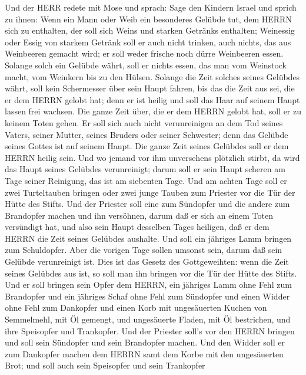  Und der HERR redete mit Mose und sprach:  Sage
den Kindern Israel und sprich zu ihnen: Wenn ein Mann oder Weib ein
besonderes Gelübde tut, dem HERRN sich zu enthalten,  der
soll sich Weins und starken Getränks enthalten; Weinessig oder Essig von
starkem Getränk soll er auch nicht trinken, auch nichts, das aus
Weinbeeren gemacht wird; er soll weder frische noch dürre Weinbeeren
essen.  Solange solch ein Gelübde währt, soll er nichts
essen, das man vom Weinstock macht, vom Weinkern bis zu den Hülsen.
 Solange die Zeit solches seines Gelübdes währt, soll kein
Schermesser über sein Haupt fahren, bis das die Zeit aus sei, die er dem
HERRN gelobt hat; denn er ist heilig und soll das Haar auf seinem Haupt
lassen frei wachsen.  Die ganze Zeit über, die er dem HERRN
gelobt hat, soll er zu keinem Toten gehen.  Er soll sich
auch nicht verunreinigen an dem Tod seines Vaters, seiner Mutter, seines
Bruders oder seiner Schwester; denn das Gelübde seines Gottes ist auf
seinem Haupt.  Die ganze Zeit seines Gelübdes soll er dem
HERRN heilig sein.  Und wo jemand vor ihm unversehens
plötzlich stirbt, da wird das Haupt seines Gelübdes verunreinigt; darum
soll er sein Haupt scheren am Tage seiner Reinigung, das ist am
siebenten Tage.  Und am achten Tage soll er zwei
Turteltauben bringen oder zwei junge Tauben zum Priester vor die Tür der
Hütte des Stifts.  Und der Priester soll eine zum Sündopfer
und die andere zum Brandopfer machen und ihn versöhnen, darum daß er
sich an einem Toten versündigt hat, und also sein Haupt desselben Tages
heiligen,  daß er dem HERRN die Zeit seines Gelübdes
aushalte. Und soll ein jähriges Lamm bringen zum Schuldopfer. Aber die
vorigen Tage sollen umsonst sein, darum daß sein Gelübde verunreinigt
ist.  Dies ist das Gesetz des Gottgeweihten: wenn die Zeit
seines Gelübdes aus ist, so soll man ihn bringen vor die Tür der Hütte
des Stifts.  Und er soll bringen sein Opfer dem HERRN, ein
jähriges Lamm ohne Fehl zum Brandopfer und ein jähriges Schaf ohne Fehl
zum Sündopfer und einen Widder ohne Fehl zum Dankopfer  und
einen Korb mit ungesäuerten Kuchen von Semmelmehl, mit Öl gemengt, und
ungesäuerte Fladen, mit Öl bestrichen, und ihre Speisopfer und
Trankopfer.  Und der Priester soll's vor den HERRN bringen
und soll sein Sündopfer und sein Brandopfer machen.  Und
den Widder soll er zum Dankopfer machen dem HERRN samt dem Korbe mit den
ungesäuerten Brot; und soll auch sein Speisopfer und sein Trankopfer
